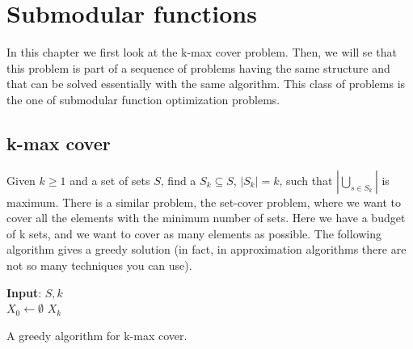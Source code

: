 \chapter{Submodular functions}

In this chapter we first look at the k-max cover problem. Then, we will se that this problem is part of a sequence of problems having the same structure and that can be solved essentially with the same algorithm. This class of problems is the one of submodular function optimization problems. 

\section{k-max cover}


Given $k \geq 1$ and a set of sets $S$, find a $S_k \subseteq S$, $|S_k| = k$, such that $|\bigcup_{s \in S_k}|$ is maximum. There is a similar problem, the set-cover problem, where we want to cover all the elements with the minimum number of sets. Here we have a budget of k sets, and we want to cover as many elements as possible. The following algorithm gives a greedy solution (in fact, in approximation algorithms there are not so many techniques you can use).

\begin{algorithm}
	\textbf{Input}: $S, k$\\
	$X_0 \gets \emptyset$\;
	\Return $X_k$
	\vspace{10pt}
	\caption{A greedy algorithm for k-max cover.}
	\label{alg:kmaxgreedy}
\end{algorithm}


